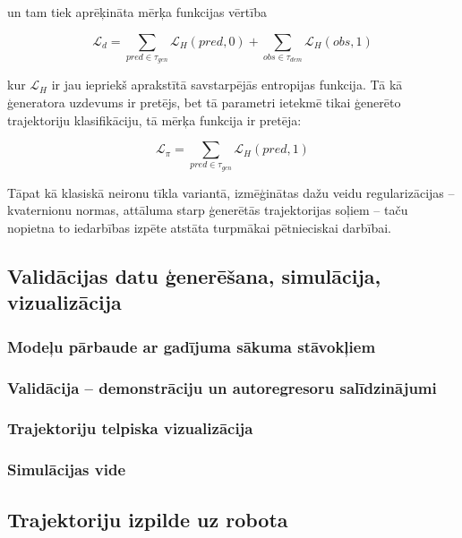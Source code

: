 \documentclass[12pt, a4paper]{article}
\numberwithin{equation}{section} %
\begin{document}
un tam tiek aprēķināta mērķa funkcijas vērtība 

\begin{equation}
    \mathcal{L}_{d} = \sum_{pred \in \tau_{gen}} \mathcal{L}_H(pred,0) + 
    \sum_{obs \in \tau_{dem}} \mathcal{L}_H(obs,1) 
\end{equation}

kur $\mathcal{L}_H$ ir jau iepriekš aprakstītā savstarpējās entropijas funkcija. Tā kā ģeneratora uzdevums ir pretējs, bet tā parametri ietekmē tikai ģenerēto trajektoriju klasifikāciju, tā mērķa funkcija ir pretēja:

\begin{equation}
    \mathcal{L}_{\pi} = \sum_{pred \in \tau_{gen}} \mathcal{L}_H(pred,1) 
\end{equation}

Tāpat kā klasiskā neironu tīkla variantā, izmēģinātas dažu veidu regularizācijas -- kvaternionu normas, attāluma starp ģenerētās trajektorijas soļiem -- taču nopietna to iedarbības izpēte atstāta turpmākai pētnieciskai darbībai.

\subsection{Validācijas datu ģenerēšana, simulācija, vizualizācija}

\subsubsection{Modeļu pārbaude ar gadījuma sākuma stāvokļiem}

\subsubsection{Validācija -- demonstrāciju un autoregresoru salīdzinājumi}

\subsubsection{Trajektoriju telpiska vizualizācija}

\subsubsection{Simulācijas vide}

\subsection{Trajektoriju izpilde uz robota}
\end{document}
